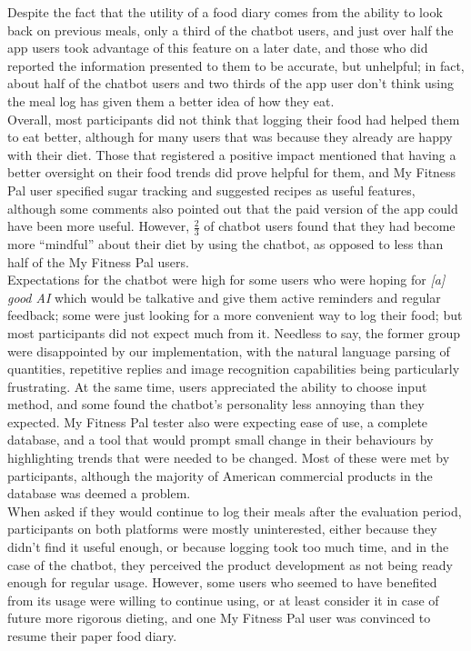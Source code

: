 Despite the fact that the utility of a food diary comes from the ability to look back on previous meals, only a third of the chatbot users, and just over half the app users took advantage of this feature on a later date, and those who did reported the information presented to them to be accurate, but unhelpful; in fact, about half of the chatbot users and two thirds of the app user don't think using the meal log has given them a better idea of how they eat. \\
Overall, most participants did not think that logging their food had helped them to eat better, although for many users that was because they already are happy with their diet. Those that registered a positive impact mentioned that having a better oversight on their food trends did prove helpful for them, and My Fitness Pal user specified sugar tracking and suggested recipes as useful features, although some comments also pointed out that the paid version of the app could have been more useful. However, $\frac{2}{3}$ of chatbot users found that they had become more ``mindful'' about their diet by using the chatbot, as opposed to less than half of the My Fitness Pal users. \\
Expectations for the chatbot were high for some users who were hoping for \textit{[a] good AI} which would be talkative and give them active reminders and regular feedback; some were just looking for a more convenient way to log their food; but most participants did not expect much from it. Needless to say, the former group were disappointed by our implementation, with the natural language parsing of quantities, repetitive replies and image recognition capabilities being particularly frustrating. At the same time, users appreciated the ability to choose input method, and some found the chatbot's personality less annoying than they expected. My Fitness Pal tester also were expecting ease of use, a complete database, and a tool that would prompt small change in their behaviours by highlighting trends that were needed to be changed. Most of these were met by participants, although the majority of American commercial products in the database was deemed a problem. \\
When asked if they would continue to log their meals after the evaluation period, participants on both platforms were mostly uninterested, either because they didn't find it useful enough, or because logging took too much time, and in the case of the chatbot, they perceived the product development as not being ready enough for regular usage. However, some users who seemed to have benefited from its usage were willing to continue using, or at least consider it in case of future more rigorous dieting, and one My Fitness Pal user was convinced to resume their paper food diary. \\
